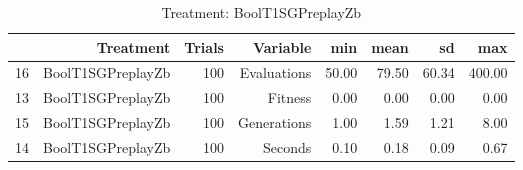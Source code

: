 \begin{table}[ht]
\centering
\begin{tabular}{rrrrrrrr}
  \hline
 & Treatment & Trials & Variable & min & mean & sd & max \\ 
  \hline
16 & BoolT1SGPreplayZb & 100 & Evaluations & 50.00 & 79.50 & 60.34 & 400.00 \\ 
  13 & BoolT1SGPreplayZb & 100 & Fitness & 0.00 & 0.00 & 0.00 & 0.00 \\ 
  15 & BoolT1SGPreplayZb & 100 & Generations & 1.00 & 1.59 & 1.21 & 8.00 \\ 
  14 & BoolT1SGPreplayZb & 100 & Seconds & 0.10 & 0.18 & 0.09 & 0.67 \\ 
   \hline
\end{tabular}
\caption{Treatment: BoolT1SGPreplayZb} 
\end{table}

